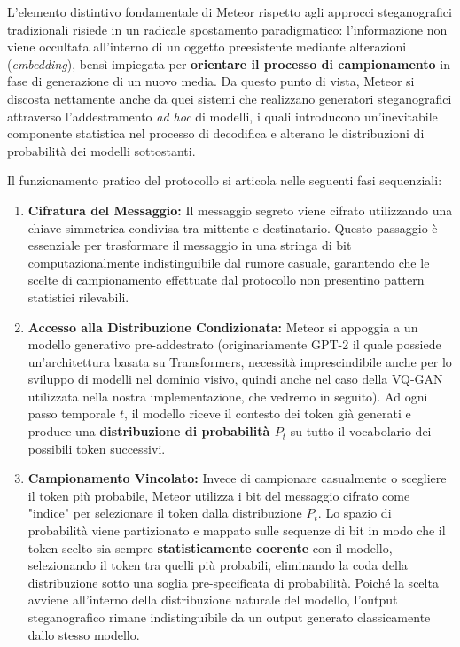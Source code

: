 L'elemento distintivo fondamentale di Meteor rispetto agli approcci steganografici tradizionali risiede in un radicale spostamento paradigmatico: l'informazione non viene occultata all'interno di un oggetto preesistente mediante alterazioni (\emph{embedding}), bensì impiegata per \textbf{orientare il processo di campionamento} in fase di generazione di un nuovo media. Da questo punto di vista, Meteor si discosta nettamente anche da quei sistemi che realizzano generatori steganografici attraverso l'addestramento \emph{ad hoc} di modelli, i quali introducono un'inevitabile componente statistica nel processo di decodifica e alterano le distribuzioni di probabilità dei modelli sottostanti.

Il funzionamento pratico del protocollo si articola nelle seguenti fasi sequenziali:

\begin{enumerate}
	\item \textbf{Cifratura del Messaggio:} Il messaggio segreto viene cifrato utilizzando una chiave simmetrica condivisa tra mittente e destinatario. Questo passaggio è essenziale per trasformare il messaggio in una stringa di bit computazionalmente indistinguibile dal rumore casuale, garantendo che le scelte di campionamento effettuate dal protocollo non presentino pattern statistici rilevabili.

	\item \textbf{Accesso alla Distribuzione Condizionata:} Meteor si appoggia a un modello generativo pre-addestrato (originariamente GPT-2 il quale possiede un'architettura basata su Transformers, necessità imprescindibile anche per lo sviluppo di modelli nel dominio visivo, quindi anche nel caso della VQ-GAN utilizzata nella nostra implementazione, che vedremo in seguito). Ad ogni passo temporale $t$, il modello riceve il contesto dei token già generati e produce una \textbf{distribuzione di probabilità $P_t$} su tutto il vocabolario dei possibili token successivi.

	\item \textbf{Campionamento Vincolato:} Invece di campionare casualmente o scegliere il token più probabile, Meteor utilizza i bit del messaggio cifrato come "indice" per selezionare il token dalla distribuzione $P_t$. Lo spazio di probabilità viene partizionato e mappato sulle sequenze di bit in modo che il token scelto sia sempre \textbf{statisticamente coerente} con il modello, selezionando il token tra quelli più probabili, eliminando la coda della distribuzione sotto una soglia pre-specificata di probabilità. Poiché la scelta avviene all'interno della distribuzione naturale del modello, l'output steganografico rimane indistinguibile da un output generato classicamente dallo stesso modello.


\end{enumerate}
